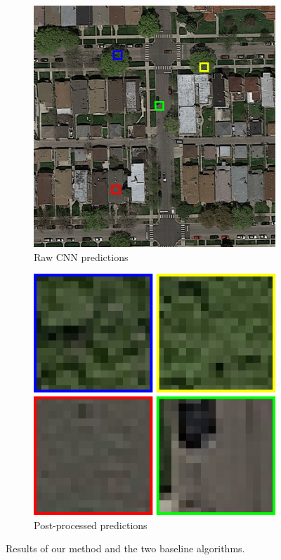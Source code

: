 \documentclass[10pt,conference,compsocconf]{IEEEtran}
\begin{document}
\begin{figure}
	\centering
	\begin{subfigure}[t]{.2\textwidth}
		\includegraphics[width=1\textwidth]{figs/context_size/full_img}
		\caption{Raw CNN predictions}
	\end{subfigure}
	\begin{subfigure}[t]{.2\textwidth}
		\includegraphics[width=1\textwidth]{figs/context_size/context16}
		\caption{Post-processed predictions}
	\end{subfigure}
	\caption{Results of our method and the two baseline algorithms.}
	\label{fig:post_processing}
\end{figure}
\end{document}
